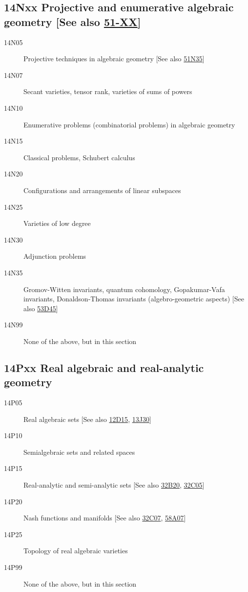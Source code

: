 \documentclass[letterpaper]{article}
\begin{document}
\subsection*{14Nxx Projective and enumerative algebraic geometry [See also \hyperref[51-XX]{51-XX}] }\label{14Nxx}
\begin{description}               
\item [14N05]\label{14N05} Projective techniques in algebraic geometry [See also \hyperref[51N35]{51N35}]
\item [14N07]\label{14N07} Secant varieties, tensor rank, varieties of sums of powers
\item [14N10]\label{14N10} Enumerative problems (combinatorial problems) in algebraic geometry
\item [14N15]\label{14N15} Classical problems, Schubert calculus
\item [14N20]\label{14N20} Configurations and arrangements of linear subspaces
\item [14N25]\label{14N25} Varieties of low degree
\item [14N30]\label{14N30} Adjunction problems
\item [14N35]\label{14N35} Gromov-Witten invariants, quantum cohomology, Gopakumar-Vafa invariants, Donaldson-Thomas invariants (algebro-geometric aspects) [See also \hyperref[53D45]{53D45}]
\item [14N99]\label{14N99} None of the above, but in this section
\end{description}          
\subsection*{14Pxx Real algebraic and real-analytic geometry }\label{14Pxx}
\begin{description}               
\item [14P05]\label{14P05} Real algebraic sets [See also \hyperref[12D15]{12D15}, \hyperref[13J30]{13J30}]
\item [14P10]\label{14P10} Semialgebraic sets and related spaces
\item [14P15]\label{14P15} Real-analytic and semi-analytic sets [See also \hyperref[32B20]{32B20}, \hyperref[32C05]{32C05}]
\item [14P20]\label{14P20} Nash functions and manifolds [See also \hyperref[32C07]{32C07}, \hyperref[58A07]{58A07}]
\item [14P25]\label{14P25} Topology of real algebraic varieties
\item [14P99]\label{14P99} None of the above, but in this section
\end{description}          
\end{document}
